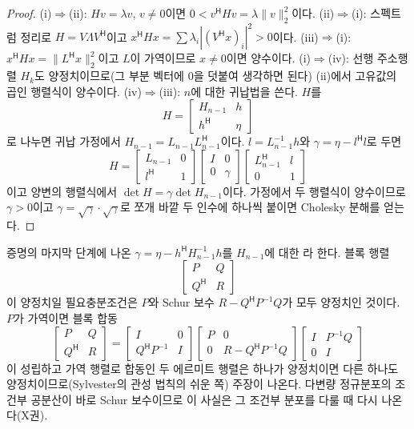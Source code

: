\begin{proof}
(i)$\Rightarrow$(ii): $Hv=\lambda v$, $v\ne0$이면 $0<v^{\mathsf H}Hv=\lambda\|v\|_2^2$이다. (ii)$\Rightarrow$(i): 스펙트럼 정리로 $H=V\Lambda V^{\mathsf H}$이고 $x^{\mathsf H}Hx=\sum\lambda_i|(V^{\mathsf H}x)_i|^2>0$이다. (iii)$\Rightarrow$(i): $x^{\mathsf H}Hx=\|L^{\mathsf H}x\|_2^2$이고 $L$이 가역이므로 $x\ne0$이면 양수이다. (i)$\Rightarrow$(iv): 선행 주소행렬 $H_k$도 양정치이므로(그 부분 벡터에 $0$을 덧붙여 생각하면 된다) (ii)에서 고유값의 곱인 행렬식이 양수이다. (iv)$\Rightarrow$(iii): $n$에 대한 귀납법을 쓴다. $H$를
\[
H=\begin{bmatrix}H_{n-1}&h\\h^{\mathsf H}&\eta\end{bmatrix}
\]
로 나누면 귀납 가정에서 $H_{n-1}=L_{n-1}L_{n-1}^{\mathsf H}$이다. $l=L_{n-1}^{-1}h$와 $\gamma=\eta-l^{\mathsf H}l$로 두면
\[
H=\begin{bmatrix}L_{n-1}&0\\l^{\mathsf H}&1\end{bmatrix}\begin{bmatrix}I&0\\0&\gamma\end{bmatrix}\begin{bmatrix}L_{n-1}^{\mathsf H}&l\\0&1\end{bmatrix}
\]
이고 양변의 행렬식에서 $\det H=\gamma\det H_{n-1}$이다. 가정에서 두 행렬식이 양수이므로 $\gamma>0$이고 $\gamma=\sqrt\gamma\cdot\sqrt\gamma$로 쪼개 바깥 두 인수에 하나씩 붙이면 Cholesky 분해를 얻는다.
\end{proof}

증명의 마지막 단계에 나온 $\gamma=\eta-h^{\mathsf H}H_{n-1}^{-1}h$를 $H_{n-1}$에 대한 라 한다. 블록 행렬
\[
\begin{bmatrix}P&Q\\Q^{\mathsf H}&R\end{bmatrix}
\]
이 양정치일 필요충분조건은 $P$와 Schur 보수 $R-Q^{\mathsf H}P^{-1}Q$가 모두 양정치인 것이다. $P$가 가역이면 블록 합동
\[
\begin{bmatrix}P&Q\\Q^{\mathsf H}&R\end{bmatrix}=\begin{bmatrix}I&0\\Q^{\mathsf H}P^{-1}&I\end{bmatrix}\begin{bmatrix}P&0\\0&R-Q^{\mathsf H}P^{-1}Q\end{bmatrix}\begin{bmatrix}I&P^{-1}Q\\0&I\end{bmatrix}
\]
이 성립하고 가역 행렬로 합동인 두 에르미트 행렬은 하나가 양정치이면 다른 하나도 양정치이므로(Sylvester의 관성 법칙의 쉬운 쪽) 주장이 나온다. 다변량 정규분포의 조건부 공분산이 바로 Schur 보수이므로 이 사실은 그 조건부 분포를 다룰 때 다시 나온다(X권).

